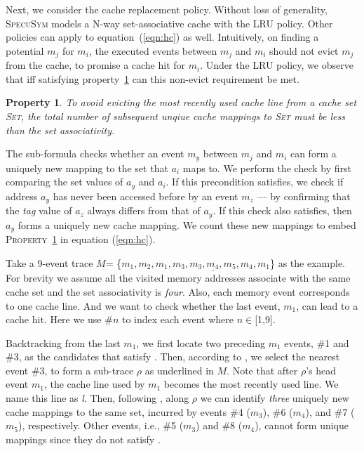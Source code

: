 \documentclass[sigconf]{acmart}
\newcommand*\circled[1]{\tikz[baseline=(char.base)]{
				\node[shape=circle,draw,inner sep=.4pt] (char) {\scriptsize{#1}};}}
\newcommand{\SpecuSym}{\textsc{SpecuSym} }
\newtheorem{pro}{Property}
\begin{document}
Next, we consider the cache replacement policy. Without loss of generality, 
\SpecuSym models a N-way set-associative cache with the LRU policy. Other 
policies can apply to equation~(\ref{eqn:hc}) as well. Intuitively, on 
finding a potential $\mathit{m_j}$ for $\mathit{m_i}$, the executed events 
between $\mathit{m_j}$ and $\mathit{m_i}$ should not evict $\mathit{m_j}$ 
from the cache, to promise a cache hit for $\mathit{m_i}$. Under the LRU 
policy, we observe that iff satisfying property~\ref{pro:p1} can this 
non-evict requirement be met.
%
\begin{pro}
  \label{pro:p1}
  To avoid evicting the most recently used cache line from a cache set 
  \textsc{Set}, the total number of subsequent unqiue cache mappings to 
  \textsc{Set} must be less than the set associativity.
\end{pro}
%
The sub-formula \circled{6} checks whether an event $\mathit{m_y}$ between 
$\mathit{m_j}$ and $\mathit{m_i}$ can form a uniquely new mapping to the set 
that $\mathit{a_i}$ maps to. We perform the check by first comparing the 
set values of $\mathit{a_y}$ and $\mathit{a_i}$. If this precondition satisfies, 
we check if address $\mathit{a_y}$ has never been accessed before by an event
$\mathit{m_z}$ --- by confirming that the \emph{tag} value of $\mathit{a_z}$ 
always differs from that of $\mathit{a_y}$. If this check also satisfies, then 
$\mathit{a_y}$ forms a uniquely new cache mapping. We count these new 
mappings to embed \textsc{Property}~\ref{pro:p1} in equation (\ref{eqn:hc}).


Take a 9-event trace $\mathit{M}$=
\{$\mathit{m_1,m_2,\underline{m_1,m_3,m_3,m_4,m_5,m_4,m_1}}$\} as the example. For 
brevity we assume all the visited memory addresses associate with the same cache 
set and the set associativity is \textit{four}. Also, each memory event corresponds 
to one cache line. And we want to check whether the last event, $\mathit{m_1}$, 
can lead to a cache hit. Here we use \#$n$ to index each event where $n\in$[1,9].


Backtracking from the last $\mathit{m_1}$, we first locate two preceding
$\mathit{m_1}$ events, \#1 and \#3, as the candidates that satisfy \circled{4}. 
Then, according to \circled{5}, we select the nearest event \#3, to form a 
sub-trace $\rho$ as underlined in $\mathit{M}$. Note that after $\rho$'s 
head event $\mathit{m_1}$, the cache line used by $\mathit{m_1}$ becomes 
the most recently used line. We name this line as \emph{l}. Then, following 
\circled{6}, along $\rho$ we can identify \emph{three} uniquely new cache 
mappings to the same set, incurred by events \#4 ($\mathit{m_3}$), \#6 
($\mathit{m_4}$), and \#7 ($\mathit{m_5}$), respectively. Other events,
i.e., \#5 ($\mathit{m_3}$) and \#8 ($\mathit{m_4}$), cannot form unique
mappings since they do not satisfy \circled{6}.
\end{document}
